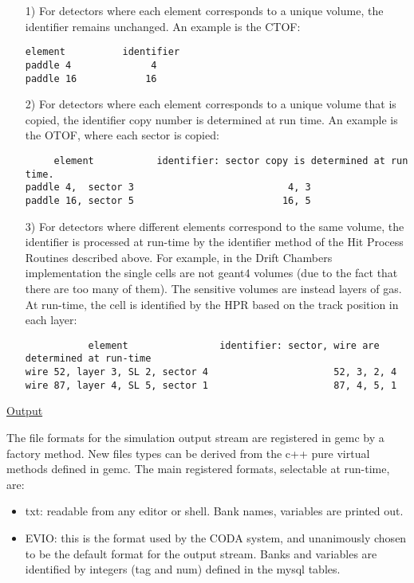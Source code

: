 \begin{itemize}


\item[1)] For detectors where each element corresponds to a unique volume, the identifier remains unchanged.
An example is the CTOF:
\footnotesize
\begin{verbatim}
element          identifier
paddle 4              4
paddle 16            16
\end{verbatim}
\normalsize



\item[2)] For detectors where each element corresponds to a unique volume that is copied, the identifier copy number is
determined at run time.
An example is the OTOF, where each sector is copied:
\footnotesize
\begin{verbatim}
     element           identifier: sector copy is determined at run time.
paddle 4,  sector 3                           4, 3
paddle 16, sector 5                          16, 5
\end{verbatim}
\normalsize


\item[3)] For detectors where different elements correspond to the same volume, the identifier is processed
at run-time by the identifier method of the Hit Process Routines described above. For example, in the Drift Chambers implementation
the single cells are not geant4 volumes (due to the fact that there are too many of them).
The sensitive volumes are instead layers of gas. At run-time, the cell is identified by the HPR
based on the track position in each layer:
\footnotesize
\begin{verbatim}
           element                identifier: sector, wire are determined at run-time
wire 52, layer 3, SL 2, sector 4                      52, 3, 2, 4
wire 87, layer 4, SL 5, sector 1                      87, 4, 5, 1
\end{verbatim}
\normalsize

\end{itemize}


\clearpage\newpage

\vskip 1.0cm
\underline{Output}
\vskip 0.5cm

\noindent
The file formats for the simulation output stream are registered in gemc by a factory method. New files types
can be derived from the c++ pure virtual methods defined in gemc. The main registered formats, selectable at run-time, are:

\begin{itemize}
\item txt: readable from any editor or shell. Bank names, variables are printed out.
\item EVIO: this is the format used by the CODA system, and unanimously chosen to be the
default format for the output stream. Banks and variables are identified by integers (tag and num)
defined in the mysql tables.
\end{itemize}


